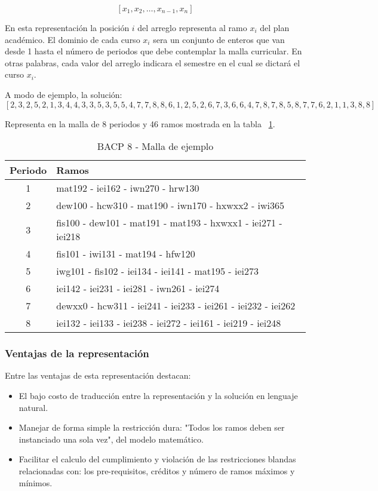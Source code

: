 \documentclass[letter, 10pt]{article}
\begin{document}
$$
	[x_{1},x_{2}, \dots ,x_{n-1},x_{n}]
$$

En esta representación la posición $i$ del arreglo representa al ramo $x_{i}$
del plan académico. El dominio de cada curso $x_{i}$ sera un conjunto de enteros
que van desde 1 hasta el número de periodos que debe contemplar la malla
curricular. En otras palabras, cada valor del arreglo indicara el semestre en el
cual se dictará el curso $x_{i}$.

A modo de ejemplo, la solución:
$$
[2,3,2,5,2,1,3,4,4,3,3,5,3,5,5,4,7,7,8,8,6,1,2,5,2,6,7,3,6,6,4,7,8,7,8,5,8,7,7,6,2,1,1,3,8,8]
$$


Representa en la malla de 8 periodos y 46 ramos mostrada en la tabla ~\ref{table:ejemplo}.

\begin{table}[h]
\centering
\label{table:ejemplo}
\caption{BACP 8 - Malla de ejemplo}
\begin{tabular}{|c|l|}
\hline 
Periodo & Ramos\tabularnewline
\hline 
\hline 
1 & mat192 - iei162 - iwn270 - hrw130\tabularnewline
\hline 
2 & dew100 - hcw310 - mat190 - iwn170 - hxwxx2 - iwi365\tabularnewline
\hline 
3 & fis100 - dew101 - mat191 - mat193 - hxwxx1 - iei271 - iei218\tabularnewline
\hline 
4 & fis101 - iwi131 - mat194 - hfw120\tabularnewline
\hline 
5 & iwg101 - fis102 - iei134 - iei141 - mat195 - iei273\tabularnewline
\hline 
6 & iei142 - iei231 - iei281 - iwn261 - iei274\tabularnewline
\hline 
7 & dewxx0 - hcw311 - iei241 - iei233 - iei261 - iei232 - iei262\tabularnewline
\hline 
8 & iei132 - iei133 - iei238 - iei272 - iei161 - iei219 - iei248\tabularnewline
\hline 
\end{tabular}

\end{table}


\subsubsection{Ventajas de la representación}
Entre las ventajas de esta representación destacan:
\begin{itemize}
\item El bajo costo de traducción entre la representación y la solución
  en lenguaje natural.
\item Manejar de forma simple la restricción dura: "Todos los ramos
  deben ser instanciado una sola vez", del modelo matemático.
\item Facilitar el calculo del cumplimiento y violación de las
  restricciones blandas relacionadas con: los pre-requisitos, créditos y
  número de ramos máximos y mínimos.
\end{itemize}
\end{document}
